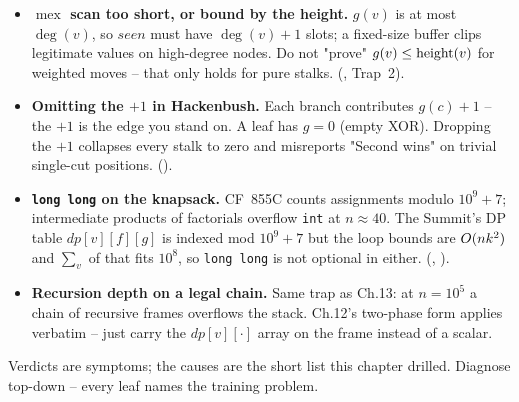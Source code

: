 \begin{itemize}[nosep, leftmargin=1.4em]
        Trap~1 of ).
  \item \textbf{$\operatorname{mex}$ scan too short, or bound by the height.}
        $g(v)$ is at most $\deg(v)$, so $\mathit{seen}$ must have $\deg(v)+1$
        slots; a fixed-size buffer clips legitimate values on high-degree
        nodes. Do not "prove" $g(v) \le \operatorname{height}(v)$ for weighted moves --
        that only holds for pure stalks. (, Trap~2).
  \item \textbf{Omitting the $+1$ in Hackenbush.} Each branch contributes
        $g(c)+1$ -- the $+1$ is the edge you stand on. A leaf has $g=0$
        (empty XOR). Dropping the $+1$ collapses every stalk to zero and
        misreports "Second wins" on trivial single-cut positions.
        ().
  \item \textbf{\lstinline{long long} on the knapsack.} CF~855C counts
        assignments modulo $10^9+7$; intermediate products of factorials
        overflow \lstinline{int} at $n \approx 40$. The Summit's DP table
        $\mathit{dp}[v][f][g]$ is indexed mod $10^9+7$ but the loop bounds
        are $O(nk^2)$ and $\sum_{v}$ of that fits $10^8$, so
        \lstinline{long long} is not optional in either. (,
        ).
  \item \textbf{Recursion depth on a legal chain.} Same trap as Ch.13: at
        $n = 10^5$ a chain of recursive  frames overflows the
        stack. Ch.12's  two-phase form applies verbatim --
        just carry the $dp[v][\cdot]$ array on the frame instead of a scalar.
\end{itemize}


Verdicts are symptoms; the causes are the short list this chapter drilled.
Diagnose top-down -- every leaf names the training problem.

